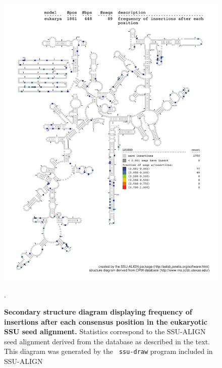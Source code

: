 \begin{figure}
\begin{center}
\includegraphics[width=5.7in]{Figures/eukarya-0p1-ifreq}
\end{center}
\caption[Secondary structure diagram displaying frequency of insertions
  after each consensus position in the eukaryotic SSU seed
  alignment]{\textbf{Secondary structure diagram displaying frequency
  of insertions after each consensus position in the eukaryotic SSU seed
  alignment.} Statistics correspond to the SSU-ALIGN seed
  alignment derived from the  database \cite{CannoneGutell02}
  as described in the text. This diagram was generated by the {\tt
  ssu-draw} program included in SSU-ALIGN}.
\label{fig:eukifreq}
\end{figure}

\newpage 

